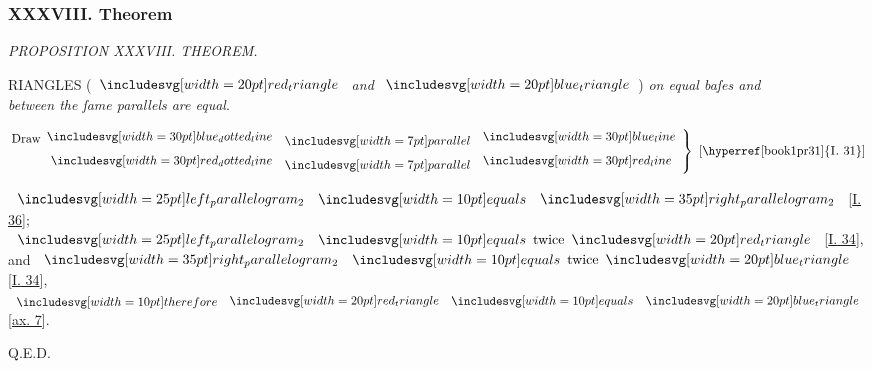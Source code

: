 \documentclass[12pt,preview]{standalone}
\begin{document}
\subsubsection{XXXVIII. Theorem}

\begin{minipage}[t]{0.64\textwidth}
    \vspace{0pt}

    \begin{center}
        \textit{PROPOSITION XXXVIII. THEOREM.}\label{book1pr38} \\
    \end{center}

    \hfill

    \begin{center}
        \raggedright \lettrine[lines=4, loversize=1, nindent=0pt]{}{}RIANGLES (\hspace{-1ex}$\img[0][0][20]{red_triangle}$ \textit{and} $\img[0][0][20]{blue_triangle}$\hspace{-1ex}) \textit{on equal baſes and\\ between the ſame parallels are equal}.
    \end{center}

    \hfill

    \hfill

    \hfill

    \begin{center}
        $\left.\begin{aligned}\text{Draw}\dottedblueline & \bparallel \blueline \\ \dottedredline & \bparallel \redline \end{aligned}\right\}\text{ [\hyperref[book1pr31]{\textsc{I.} 31}]}$
    \end{center}

    \hfill

    \hfill

    \begin{center}
        $\img{left_parallelogram_2} \bequals \img[0][0][35]{right_parallelogram_2}$ [\hyperref[book1pr36]{\textsc{I.} 36}];\\
        $\img{left_parallelogram_2} \bequals \text{twice} \img[0][0][20]{red_triangle}$ [\hyperref[book1pr34]{\textsc{I.} 34}],\\
        and $\img[0][0][35]{right_parallelogram_2} \bequals \text{twice} \img[0][0][20]{blue_triangle}$ [\hyperref[book1pr34]{\textsc{I.} 34}],\\
        $\btherefore \img[0][0][20]{red_triangle} \bequals \img[0][0][20]{blue_triangle}$ [\hyperref[ax7]{ax. 7}].
    \end{center}

    \hfill

    \hfill Q.E.D.
\end{minipage}%
\hfill
\begin{minipage}[t]{0.33\textwidth}
    \vspace{44pt}
    
\end{minipage}
\end{document}
